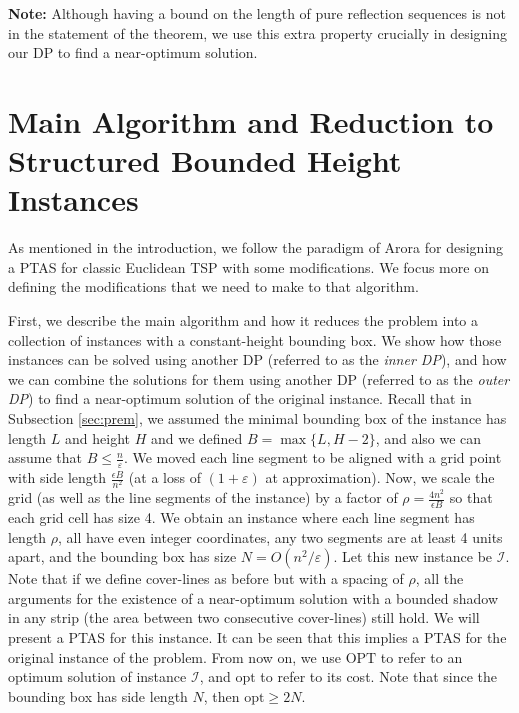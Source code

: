 \documentclass[10pt,a4paper]{amsart}
\theoremstyle{thmstyleone}
\newcommand{\eps}{\varepsilon}
\newcommand{\opt}{{\text{opt}}}
\newcommand{\OPT}{{\text{OPT}}}
\begin{document}
\vspace{.5cm}
\noindent \textbf{Note:} Although having a bound on the  length  of pure reflection sequences is not in the statement of the theorem, we use this extra property crucially in designing our DP to find a near-optimum solution.
        
\section{Main Algorithm and Reduction to Structured Bounded Height Instances}\label{sec:main-alg}
As mentioned in the introduction, we follow the paradigm of Arora \cite{Arora98} for designing a PTAS for classic Euclidean TSP with some modifications. We focus more on defining the modifications that we need to make to that algorithm. 

First, we describe the main algorithm and how it reduces the problem into a collection of 
instances with a constant-height bounding box. 
We show how those instances can be solved using another DP (referred to as the {\em inner DP}), and how we can combine the solutions for them using another DP (referred to as the {\em outer DP}) to find a near-optimum solution of the original instance.
Recall that in Subsection \ref{sec:prem}, we assumed the minimal bounding box of the instance has length $L$ and height $H$
and we defined $ B = \max \{L, H-2\} $, and also we can assume that $B\leq \frac{n}{\eps}$. We moved each line segment to be aligned with a grid point with side length $\frac{\epsilon B}{n^2}$ (at a loss of $(1+\eps)$ at approximation). Now, we scale the grid (as well as the line segments of the instance) by a factor of $\rho=\frac{4n^2}{\epsilon B}$ so that each grid cell has size 4. We obtain
an instance where each line segment has length $\rho$, all have even integer coordinates, any two segments are at least 4 units apart, and the bounding box has size $N=O(n^2/\eps)$. Let this new instance be $\mathcal I$. 
Note that if we define cover-lines as before but with a spacing of $\rho$,
all the arguments for the existence of a near-optimum solution with a bounded shadow in any strip (the area between two consecutive cover-lines) still hold. We will present a PTAS for this instance. It can be seen that this implies a PTAS for the original instance of the problem. From now on, we use $\OPT$ to refer to an optimum solution of instance
$\mathcal I$, and $\opt$ to refer to its cost. Note that since the bounding box has side length $N$, then $\opt\geq 2N$.
\end{document}
